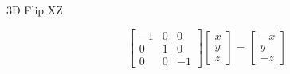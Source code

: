 \documentclass{beamer}
\begin{document}
\begin{frame}{3D Flip XZ}

\[ \left[ \begin{array}{ccc} -1 & 0 & 0\\ 0 & 1 & 0 \\ 0 & 0 & -1 \end{array} \right] \left[ \begin{array}{c} x \\ y \\ z \end{array} \right] =  \left[ \begin{array}{c} -x \\ y \\ -z\end{array} \right] \]

\begin{figure}[t]
    \captionsetup[subfloat]{labelformat=empty}
	\centering

\end{figure}

\end{frame}
\end{document}
